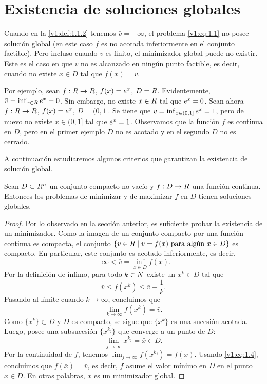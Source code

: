 
\section{Existencia de soluciones globales}
\label{v1:sec:1.2}

Cuando en la \cref{v1:def:1.1.2} tenemos $\bar{v} = -\infty$, el problema \eqref{v1:eq:1.1} no posee solución global (en este caso $f$ es no acotada inferiormente en el conjunto factible). Pero incluso cuando $\bar{v}$ es finito, el minimizador global puede no existir. Este es el caso en que $\bar{v}$ no es alcanzado en ningún punto factible, es decir, cuando no existe $x \in D$ tal que $f(x) = \bar{v}$.

Por ejemplo, sean $f : R \to R$, $f(x) = e^x$, $D = R$. Evidentemente, $\bar{v} = \inf_{x \in R} e^x = 0$. Sin embargo, no existe $x \in R$ tal que $e^x = 0$. Sean ahora $f : R \to R$, $f(x) = e^x$, $D = (0,1]$. Se tiene que $\bar{v} = \inf_{x \in (0,1]} e^x = 1$, pero de nuevo no existe $x \in (0,1]$ tal que $e^x = 1$. Observamos que la función $f$ es continua en $D$, pero en el primer ejemplo $D$ no es acotado y en el segundo $D$ no es cerrado.

A continuación estudiaremos algunos criterios que garantizan la existencia de solución global.

\begin{theorem}[Weierstrass]\label{v1:thm:1.2.1}
    Sean $D \subset R^n$ un conjunto compacto no vacío y $f : D \to R$ una función continua. Entonces los problemas de minimizar y de maximizar $f$ en $D$ tienen soluciones globales.
\end{theorem}

\begin{proof}
    Por lo observado en la sección anterior, es suficiente probar la existencia de un minimizador.
    Como la imagen de un conjunto compacto por una función continua es compacta, el conjunto $\{v \in R \mid v = f(x) \text{ para algún } x \in D\}$ es compacto. En particular, este conjunto es acotado inferiormente, es decir,
    \[
        -\infty < \bar{v} = \inf_{x \in D} f(x).
    \]
    Por la definición de ínfimo, para todo $k \in N$ existe un $x^k \in D$ tal que
    \[
        \bar{v} \le f(x^k) \le \bar{v} + \frac{1}{k}.
    \]
    Pasando al límite cuando $k \to \infty$, concluimos que
    \begin{equation}
        \lim_{k \to \infty} f(x^k) = \bar{v}. \label{v1:eq:1.4}
    \end{equation}
    Como $\{x^k\} \subset D$ y $D$ es compacto, se sigue que $\{x^k\}$ es una sucesión acotada. Luego, posee una subsucesión $\{x^{k_j}\}$ que converge a un punto de $D$:
    \[
        \lim_{j \to \infty} x^{k_j} = \bar{x} \in D.
    \]
    Por la continuidad de $f$, tenemos $\lim_{j \to \infty} f(x^{k_j}) = f(\bar{x})$. Usando \eqref{v1:eq:1.4}, concluimos que $f(\bar{x}) = \bar{v}$, es decir, $f$ asume el valor mínimo en $D$ en el punto $\bar{x} \in D$. En otras palabras, $\bar{x}$ es un minimizador global.
\end{proof}

